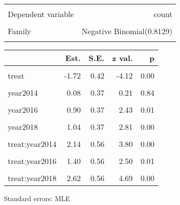 \documentclass[
]{article}
\begin{document}
\begin{table}[!h]
\centering
\begin{tabular}{lr}
\toprule
\cellcolor{gray!10}{Observations} & \cellcolor{gray!10}{252}\\
Dependent variable & count\\
\cellcolor{gray!10}{Type} & \cellcolor{gray!10}{Generalized linear model}\\
Family & Negative Binomial(0.8129)\\
\cellcolor{gray!10}{Link} & \cellcolor{gray!10}{log}\\
\bottomrule
\end{tabular}
\end{table}  \begin{table}[!h]
\centering
\begin{threeparttable}
\begin{tabular}{lrrrr}
\toprule
  & Est. & S.E. & z val. & p\\
\midrule
\cellcolor{gray!10}{(Intercept)} & \cellcolor{gray!10}{2.35} & \cellcolor{gray!10}{0.26} & \cellcolor{gray!10}{8.89} & \cellcolor{gray!10}{0.00}\\
treat & -1.72 & 0.42 & -4.12 & 0.00\\
\cellcolor{gray!10}{year2013} & \cellcolor{gray!10}{-0.35} & \cellcolor{gray!10}{0.38} & \cellcolor{gray!10}{-0.93} & \cellcolor{gray!10}{0.35}\\
year2014 & 0.08 & 0.37 & 0.21 & 0.84\\
\cellcolor{gray!10}{year2015} & \cellcolor{gray!10}{0.86} & \cellcolor{gray!10}{0.37} & \cellcolor{gray!10}{2.32} & \cellcolor{gray!10}{0.02}\\
\addlinespace
year2016 & 0.90 & 0.37 & 2.43 & 0.01\\
\cellcolor{gray!10}{year2017} & \cellcolor{gray!10}{1.56} & \cellcolor{gray!10}{0.37} & \cellcolor{gray!10}{4.25} & \cellcolor{gray!10}{0.00}\\
year2018 & 1.04 & 0.37 & 2.81 & 0.00\\
\cellcolor{gray!10}{treat:year2013} & \cellcolor{gray!10}{1.52} & \cellcolor{gray!10}{0.57} & \cellcolor{gray!10}{2.66} & \cellcolor{gray!10}{0.01}\\
treat:year2014 & 2.14 & 0.56 & 3.80 & 0.00\\
\addlinespace
\cellcolor{gray!10}{treat:year2015} & \cellcolor{gray!10}{2.12} & \cellcolor{gray!10}{0.56} & \cellcolor{gray!10}{3.79} & \cellcolor{gray!10}{0.00}\\
treat:year2016 & 1.40 & 0.56 & 2.50 & 0.01\\
\cellcolor{gray!10}{treat:year2017} & \cellcolor{gray!10}{1.55} & \cellcolor{gray!10}{0.56} & \cellcolor{gray!10}{2.77} & \cellcolor{gray!10}{0.01}\\
treat:year2018 & 2.62 & 0.56 & 4.69 & 0.00\\
\bottomrule
\end{tabular}
\begin{tablenotes}
\item Standard errors: MLE
\end{tablenotes}
\end{threeparttable}
\end{table}
\end{document}
